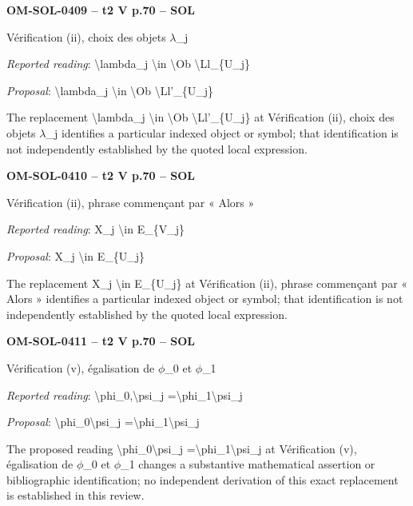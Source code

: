 \par\noindent\textbf{OM-SOL-0409 -- t2 V p.70 -- SOL}\par
Vérification (ii), choix des objets \ensuremath{\lambda}\_j\par
\emph{Reported reading}: \textbackslash{}lambda\_j \textbackslash{}in \textbackslash{}Ob \textbackslash{}Ll\_\{U\_j\}\par
\emph{Proposal}: \textbackslash{}lambda\_j \textbackslash{}in \textbackslash{}Ob \textbackslash{}Ll'\_\{U\_j\}\par
The replacement \textbackslash{}lambda\_j \textbackslash{}in \textbackslash{}Ob \textbackslash{}Ll'\_\{U\_j\} at Vérification (ii), choix des objets \ensuremath{\lambda}\_j identifies a particular indexed object or symbol; that identification is not independently established by the quoted local expression.\par
\par\noindent\textbf{OM-SOL-0410 -- t2 V p.70 -- SOL}\par
Vérification (ii), phrase commençant par « Alors »\par
\emph{Reported reading}: X\_j \textbackslash{}in E\_\{V\_j\}\par
\emph{Proposal}: X\_j \textbackslash{}in E\_\{U\_j\}\par
The replacement X\_j \textbackslash{}in E\_\{U\_j\} at Vérification (ii), phrase commençant par « Alors » identifies a particular indexed object or symbol; that identification is not independently established by the quoted local expression.\par
\par\noindent\textbf{OM-SOL-0411 -- t2 V p.70 -- SOL}\par
Vérification (v), égalisation de \ensuremath{\phi}\_0 et \ensuremath{\phi}\_1\par
\emph{Reported reading}: \textbackslash{}phi\_0,\textbackslash{}psi\_j =\allowbreak  \textbackslash{}phi\_1\textbackslash{}psi\_j\par
\emph{Proposal}: \textbackslash{}phi\_0\textbackslash{}psi\_j =\allowbreak  \textbackslash{}phi\_1\textbackslash{}psi\_j\par
The proposed reading \textbackslash{}phi\_0\textbackslash{}psi\_j =\allowbreak  \textbackslash{}phi\_1\textbackslash{}psi\_j at Vérification (v), égalisation de \ensuremath{\phi}\_0 et \ensuremath{\phi}\_1 changes a substantive mathematical assertion or bibliographic identification; no independent derivation of this exact replacement is established in this review.\par
